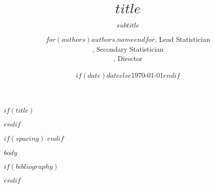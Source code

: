 \documentclass[$if(fontsize)$$fontsize$$else$11pt$endif$$if(titlepage)$, titlepage$endif$$if(prelim)$, prelim$endif$$if(nologo)$, nologo$endif$$if(nocopyright)$, nocopyright$endif$$if(nofunding)$, nofunding$endif$$if(nouid)$, nouid$endif$$if(twoside)$, twoside$endif$]{article}
\title{$title$}
\subtitle{$subtitle$}
\author{$for(authors)$$authors.name$$endfor$, Lead Statistician \\ 
        \secondary, Secondary Statistician \\ 
        \director, Director}
\date{$if(date)$$date$$else$\today$endif$}
\begin{document}
$if(title)$
\maketitle
$endif$



$if(spacing)$
$endif$

$body$

$if(bibliography)$


$endif$
\end{document}
